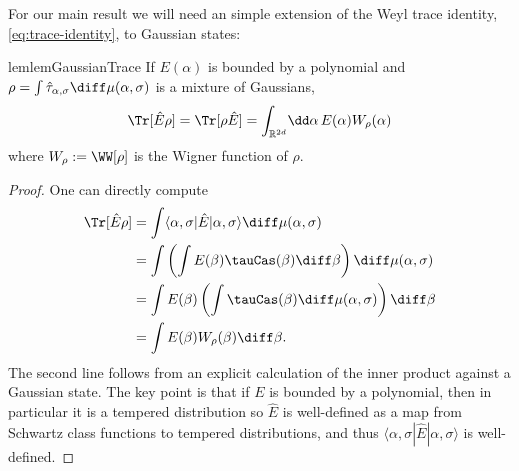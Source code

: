 \documentclass{article}
\numberwithin{equation}{section}
\begin{document}
For our main result we will need an simple extension of the Weyl trace identity, \eqref{eq:trace-identity}, to Gaussian states:
\begin{restatable}{lem}{lemGaussianTrace}\label{lem:gaussian-trace} 
If $E(\alpha)$ is bounded by a polynomial and $\rho  = \int \hat{\tau}_{\alpha,\sigma}\diff \mu(\alpha,\sigma)$ is a mixture of Gaussians,
\begin{align}\label{eq:schwartz-trace-formula}
    \Tr[\hat{E}\rho] = \Tr[\rho \hat{E}] = 
    \int_{\mathbb{R}^{2d}}\! \dd \alpha\, E(\alpha)W_\rho(\alpha)
\end{align}
where $W_\rho:=\WW[\rho]$ is the Wigner function of $\rho$.
\end{restatable}
\begin{proof}
One can directly compute
\begin{equation}
\begin{split}
\Tr[\hat{E}\rho]
&= \int \langle\alpha,\sigma|\hat{E}|\alpha,\sigma\rangle
\diff\mu(\alpha,\sigma) \\
&= \int \left(\int E(\beta) \tauCas (\beta) \diff \beta \right) 
\diff\mu (\alpha,\sigma) \\
&= 
\int E(\beta) 
\left(\int \tauCas (\beta)\diff\mu(\alpha,\sigma)\right) \diff \beta \\
&= 
\int E(\beta) 
W_\rho(\beta) \diff \beta.
\end{split}
\end{equation}
The second line follows from an explicit calculation of 
the inner product against a Gaussian state.  The key 
point is that if $E$ is bounded by a polynomial,
then in particular it is a tempered distribution so
$\hat{E}$ is well-defined as a map from Schwartz class
functions to tempered distributions, and thus
$\langle \alpha,\sigma| \hat{E}|\alpha,\sigma\rangle$
is well-defined.
\end{proof}
\end{document}
